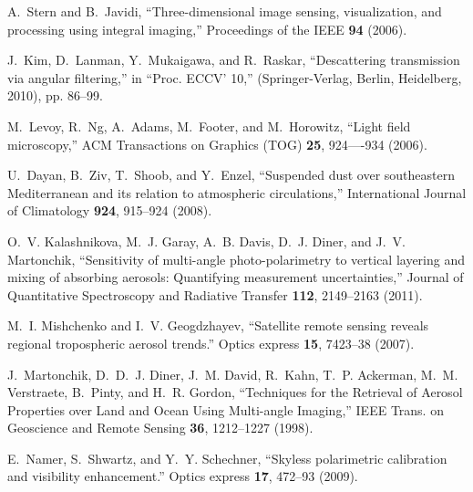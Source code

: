 \documentclass[10pt,letterpaper]{article}
\begin{document}


\begin{thebibliography}{10}
\newcommand{\enquote}[1]{``#1''}

A.~Stern and B.~Javidi, \enquote{{Three-dimensional image sensing,
  visualization, and processing using integral imaging},} Proceedings of the
  IEEE \textbf{94} (2006).

J.~Kim, D.~Lanman, Y.~Mukaigawa, and R.~Raskar, \enquote{{Descattering
  transmission via angular filtering},} in \enquote{Proc. ECCV' 10,}
  (Springer-Verlag, Berlin, Heidelberg, 2010), pp. 86--99.

M.~Levoy, R.~Ng, A.~Adams, M.~Footer, and M.~Horowitz, \enquote{{Light field
  microscopy},} ACM Transactions on Graphics (TOG) \textbf{25}, 924----934
  (2006).

U.~Dayan, B.~Ziv, T.~Shoob, and Y.~Enzel, \enquote{{Suspended dust over
  southeastern Mediterranean and its relation to atmospheric circulations},}
  International Journal of Climatology \textbf{924}, 915--924 (2008).

O.~V. Kalashnikova, M.~J. Garay, A.~B. Davis, D.~J. Diner, and J.~V.
  Martonchik, \enquote{{Sensitivity of multi-angle photo-polarimetry to
  vertical layering and mixing of absorbing aerosols: Quantifying measurement
  uncertainties},} Journal of Quantitative Spectroscopy and Radiative Transfer
  \textbf{112}, 2149--2163 (2011).

M.~I. Mishchenko and I.~V. Geogdzhayev, \enquote{{Satellite remote sensing
  reveals regional tropospheric aerosol trends.}} Optics express \textbf{15},
  7423--38 (2007).

J.~Martonchik, D.~D.~J. Diner, J.~M. David, R.~Kahn, T.~P. Ackerman, M.~M.
  Verstraete, B.~Pinty, and H.~R. Gordon, \enquote{{Techniques for the
  Retrieval of Aerosol Properties over Land and Ocean Using Multi-angle
  Imaging},} IEEE Trans. on Geoscience and Remote Sensing \textbf{36},
  1212--1227 (1998).

E.~Namer, S.~Shwartz, and Y.~Y. Schechner, \enquote{{Skyless polarimetric
  calibration and visibility enhancement.}} Optics express \textbf{17}, 472--93
  (2009).


\end{thebibliography}
\end{document}
